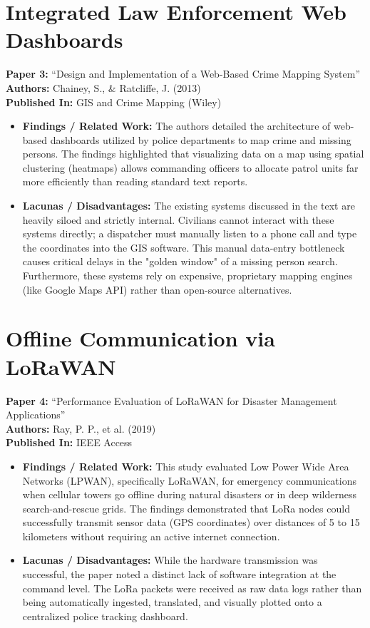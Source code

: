 \documentclass[12pt,a4paper]{report}
\begin{document}
\section{Integrated Law Enforcement Web Dashboards}
\textbf{Paper 3:} “Design and Implementation of a Web-Based Crime Mapping System” \\
\textbf{Authors:} Chainey, S., \& Ratcliffe, J. (2013) \\
\textbf{Published In:} GIS and Crime Mapping (Wiley)
\begin{itemize}
    \item \textbf{Findings / Related Work:} The authors detailed the architecture of web-based dashboards utilized by police departments to map crime and missing persons. The findings highlighted that visualizing data on a map using spatial clustering (heatmaps) allows commanding officers to allocate patrol units far more efficiently than reading standard text reports.
    \item \textbf{Lacunas / Disadvantages:} The existing systems discussed in the text are heavily siloed and strictly internal. Civilians cannot interact with these systems directly; a dispatcher must manually listen to a phone call and type the coordinates into the GIS software. This manual data-entry bottleneck causes critical delays in the "golden window" of a missing person search. Furthermore, these systems rely on expensive, proprietary mapping engines (like Google Maps API) rather than open-source alternatives.
\end{itemize}

\section{Offline Communication via LoRaWAN}
\textbf{Paper 4:} “Performance Evaluation of LoRaWAN for Disaster Management Applications” \\
\textbf{Authors:} Ray, P. P., et al. (2019) \\
\textbf{Published In:} IEEE Access
\begin{itemize}
    \item \textbf{Findings / Related Work:} This study evaluated Low Power Wide Area Networks (LPWAN), specifically LoRaWAN, for emergency communications when cellular towers go offline during natural disasters or in deep wilderness search-and-rescue grids. The findings demonstrated that LoRa nodes could successfully transmit sensor data (GPS coordinates) over distances of 5 to 15 kilometers without requiring an active internet connection.
    \item \textbf{Lacunas / Disadvantages:} While the hardware transmission was successful, the paper noted a distinct lack of software integration at the command level. The LoRa packets were received as raw data logs rather than being automatically ingested, translated, and visually plotted onto a centralized police tracking dashboard.
\end{itemize}
\end{document}
